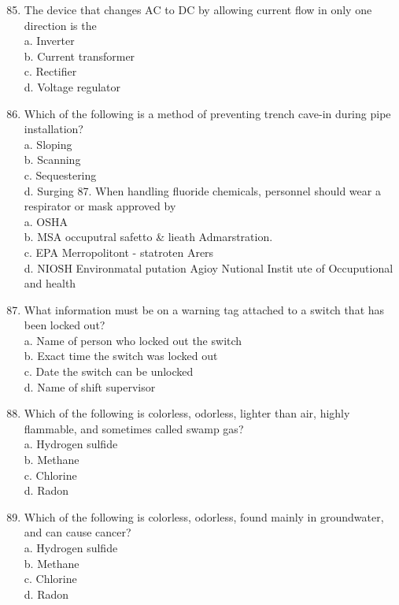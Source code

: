 \documentclass[10pt]{article}
\begin{document}
\begin{enumerate}
  \setcounter{enumi}{84}
  \item The device that changes $\mathrm{AC}$ to $\mathrm{DC}$ by allowing current flow in only one direction is the\\
a. Inverter\\
b. Current transformer\\
c. Rectifier\\
d. Voltage regulator

  \item Which of the following is a method of preventing trench cave-in during pipe installation?\\
a. Sloping\\
b. Scanning\\
c. Sequestering\\
d. Surging 87. When handling fluoride chemicals, personnel should wear a respirator or mask approved by\\
a. OSHA\\
b. MSA occuputral safetto \& lieath Admarstration.\\
c. EPA Merropolitont - statroten Arers\\
d. $\mathrm{NIOSH}$ Environmatal putation Agioy Nutional Instit ute of Occuputional and health

  \item What information must be on a warning tag attached to a switch that has been locked out?\\
a. Name of person who locked out the switch\\
b. Exact time the switch was locked out\\
c. Date the switch can be unlocked\\
d. Name of shift supervisor

  \item Which of the following is colorless, odorless, lighter than air, highly flammable, and sometimes called swamp gas?\\
a. Hydrogen sulfide\\
b. Methane\\
c. Chlorine\\
d. Radon

  \item Which of the following is colorless, odorless, found mainly in groundwater, and can cause cancer?\\
a. Hydrogen sulfide\\
b. Methane\\
c. Chlorine\\
d. Radon


\end{enumerate}
\end{document}
